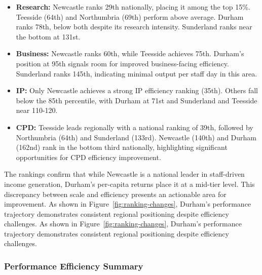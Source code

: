 \documentclass[journal,onecolumn, 10pt,draftclsnofoot]{IEEEtran}
\begin{document}
\begin{itemize}
    \item \textbf{Research:} Newcastle ranks 29th nationally, placing it among the top 15\%. Teesside (64th) and Northumbria (69th) perform above average. Durham ranks 78th, below both despite its research intensity. Sunderland ranks near the bottom at 131st.
    
    \item \textbf{Business:} Newcastle ranks 60th, while Teesside achieves 75th. Durham's position at 95th signals room for improved business-facing efficiency. Sunderland ranks 145th, indicating minimal output per staff day in this area.
    
    \item \textbf{IP:} Only Newcastle achieves a strong IP efficiency ranking (35th). Others fall below the 85th percentile, with Durham at 71st and Sunderland and Teesside near 110-120.
    
    \item \textbf{CPD:} Teesside leads regionally with a national ranking of 39th, followed by Northumbria (64th) and Sunderland (133rd). Newcastle (140th) and Durham (162nd) rank in the bottom third nationally, highlighting significant opportunities for CPD efficiency improvement.
\end{itemize}

The rankings confirm that while Newcastle is a national leader in staff-driven income generation, Durham's per-capita returns place it at a mid-tier level. This discrepancy between scale and efficiency presents an actionable area for improvement. As shown in Figure~\ref{fig:ranking-changes}, Durham's performance trajectory demonstrates consistent regional positioning despite efficiency challenges. As shown in Figure~\ref{fig:ranking-changes}, Durham's performance trajectory demonstrates consistent regional positioning despite efficiency challenges.

\subsubsection{Performance Efficiency Summary}
\end{document}
